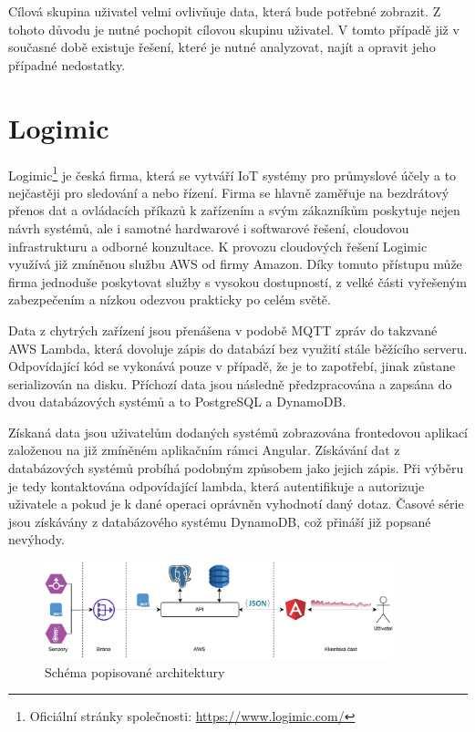 Cílová skupina uživatel velmi ovlivňuje data, která bude potřebné zobrazit. Z tohoto důvodu je nutné pochopit cílovou skupinu uživatel. V  tomto případě již v současné době existuje řešení, které je nutné analyzovat, najít a opravit jeho případné nedostatky. 

\section{Logimic}
Logimic\footnote{Oficiální stránky společnosti: \url{https://www.logimic.com/}} je česká firma, která se vytváří IoT systémy pro průmyslové účely a to nejčastěji pro sledování a nebo řízení. Firma se hlavně zaměřuje na bezdrátový přenos dat a ovládacích příkazů k zařízením a svým zákazníkům poskytuje nejen návrh systémů, ale i samotné hardwarové i softwarové řešení, cloudovou infrastrukturu a odborné konzultace. K provozu cloudových řešení Logimic využívá již zmíněnou službu AWS od firmy Amazon. Díky tomuto přístupu může firma jednoduše poskytovat služby s vysokou dostupností, z velké části vyřešeným zabezpečením a nízkou odezvou prakticky po celém světě. 

Data z chytrých zařízení jsou přenášena v podobě MQTT zpráv do takzvané AWS Lambda, která dovoluje zápis do databází bez využití stále běžícího serveru. Odpovídající kód se vykonává pouze v případě, že je to zapotřebí, jinak zůstane serializován na disku. Příchozí data jsou následně předzpracována a zapsána do dvou databázových systémů a to PostgreSQL a DynamoDB.

Získaná data jsou uživatelům dodaných systémů zobrazována frontedovou aplikací založenou na již zmíněném aplikačním rámci Angular. Získávání dat z databázových systémů probíhá podobným způsobem jako jejich zápis. Při výběru je tedy kontaktována odpovídající lambda, která autentifikuje a autorizuje uživatele a pokud je k dané operaci oprávněn vyhodnotí daný dotaz. Časové série jsou získávány z databázového systému DynamoDB, což přináší již popsané nevýhody. 

\begin{figure}[H]
\label{question4}
\begin{center}
    \includegraphics[width=0.9\textwidth]{obrazky-figures/DIP-architecture.pdf}
\end{center}
\caption{Schéma popisované architektury}
\end{figure}

